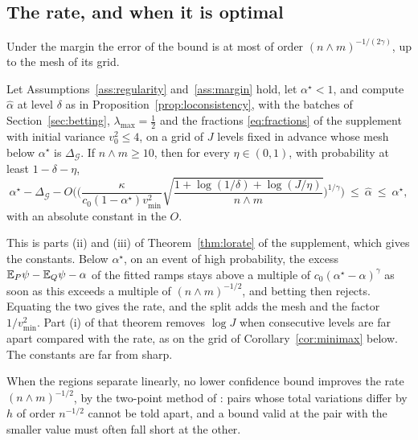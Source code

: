\subsection{The rate, and when it is optimal}
\label{sec:bothrates}
\label{sec:optimality}

Under the margin the error of the bound is at most of order $(n\wedge m)^{-1/(2\gamma)}$, up to the mesh of its
grid.

\begin{theorem}
\label{thm:loratemain}
Let Assumptions~\ref{ass:regularity} and~\ref{ass:margin} hold, let $\alpha^\star<1$, and compute
$\widehat\alpha$ at level $\delta$ as in Proposition~\ref{prop:loconsistency}, with the batches of
Section~\ref{sec:betting}, $\lambda_{\max}=\tfrac12$ and the fractions \eqref{eq:fractions} of the supplement with initial
variance $v_0^2\le4$, on a grid of $J$ levels
fixed in advance whose mesh below $\alpha^\star$ is $\Delta_{\mathcal G}$. If $n\wedge m\ge10$, then for every $\eta\in(0,1)$, with
probability at least $1-\delta-\eta$,
\[
\alpha^\star-\Delta_{\mathcal G}-O\bigg(\bigg(\frac{\kappa}{c_0(1-\alpha^\star)v^2_{\min}}
\sqrt{\frac{1+\log(1/\delta)+\log(J/\eta)}{n\wedge m}}\bigg)^{1/\gamma}\bigg)
\ \le\ \widehat\alpha\ \le\ \alpha^\star ,
\]
with an absolute constant in the $O$.
\end{theorem}

This is parts (ii) and (iii) of Theorem~\ref{thm:lorate} of the supplement, which gives the constants. Below
$\alpha^\star$, on an event of high probability, the excess $\mathbb{E}_P\psi-\mathbb{E}_Q\psi-\alpha$ of the fitted ramps stays above a
multiple of $c_0(\alpha^\star-\alpha)^\gamma$ as soon as this exceeds a multiple of $(n\wedge m)^{-1/2}$, and betting
then rejects. Equating the two gives the rate, and the split adds the mesh and the factor $1/v^2_{\min}$. Part (i) of
that theorem removes $\log J$ when consecutive levels are far apart compared with the rate, as on the grid of
Corollary~\ref{cor:minimax} below. The constants are far from sharp.

When the regions separate linearly, no lower confidence bound improves the rate $(n\wedge m)^{-1/2}$, by the two-point
method of \citet{lecam1973convergence}: pairs whose total variations differ by $h$ of order $n^{-1/2}$ cannot be told
apart, and a bound valid at the pair with the smaller value must often fall short at the other.

